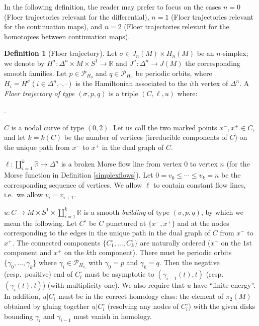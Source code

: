 \documentclass[12pt]{article}
\theoremstyle{definition}
\newtheorem{definition}[theorem]{Definition}
\theoremstyle{remark}
\numberwithin{equation}{subsection}
\newcommand{\RR}{\mathbb R}
\newcommand{\PPP}{\mathcal P}
\newcounter{rcounti}
\newenvironment{rlist}{\begin{list}{\roman{rcounti}.}{\usecounter{rcounti}
\setlength\itemsep{0pt}
\setlength\labelsep{4pt}
\setlength\labelwidth{16pt}
\setlength\leftmargin{32pt}
\setlength\listparindent{0pt}
\setlength\parsep{0pt}
\setlength\parskip{0pt}
\setlength\partopsep{0pt}
\setlength\rightmargin{0pt}
\setlength\topsep{0pt}
\setlength\itemindent{0pt}
}}{\end{list}}
\begin{document}
In the following definition, the reader may prefer to focus on the cases $n=0$ (Floer trajectories relevant for the differential), $n=1$ (Floer trajectories relevant for the continuation maps), and $n=2$ (Floer trajectories relevant for the homotopies between continuation maps).

\begin{definition}[Floer trajectory]\label{floertrajdef}
Let $\sigma\in J_n(M)\times H_n(M)$ be an $n$-simplex; we denote by $H^\sigma:\Delta^n\times M\times S^1\to\RR$ and $J^\sigma:\Delta^n\to J(M)$ the corresponding smooth families.  Let $p\in\PPP_{H_0}$ and $q\in\PPP_{H_n}$ be periodic orbits, where $H_i=H^\sigma(i\in\Delta^n,\cdot,\cdot)$ is the Hamiltonian associated to the $i$th vertex of $\Delta^n$.  A \emph{Floer trajectory of type $(\sigma,p,q)$} is a triple $(C,\ell,u)$ where:
\begin{rlist}
\item$C$ is a nodal curve of type $(0,2)$.  Let us call the two marked points $x^-,x^+\in C$, and let $k=k(C)$ be the number of vertices (irreducible components of $C$) on the unique path from $x^-$ to $x^+$ in the dual graph of $C$.
\item$\ell:\coprod_{i=1}^k\RR\to\Delta^n$ is a broken Morse flow line from vertex $0$ to vertex $n$ (for the Morse function in Definition \ref{simplexflows}).  Let $0=v_0\leq\cdots\leq v_k=n$ be the corresponding sequence of vertices.  We allow $\ell$ to contain constant flow lines, i.e.\ we allow $v_i=v_{i+1}$.
\item\label{buildingdef}$u:C\to M\times S^1\times\coprod_{i=1}^k\RR$ is a smooth \emph{building} of type $(\sigma,p,q)$, by which we mean the following.  Let $C^\circ$ be $C$ punctured at $\{x^-,x^+\}$ and at the nodes corresponding to the edges in the unique path in the dual graph of $C$ from $x^-$ to $x^+$.  The connected components $\{C^\circ_1,\ldots,C^\circ_k\}$ are naturally ordered ($x^-$ on the $1$st component and $x^+$ on the $k$th component).  There must be periodic orbits $\{\gamma_0,\ldots,\gamma_k\}$ where $\gamma_i\in\PPP_{H_{v_i}}$ with $\gamma_0=p$ and $\gamma_k=q$.  Then the negative (resp.\ positive) end of $C^\circ_i$ must be asymptotic to $(\gamma_{i-1}(t),t)$ (resp.\ $(\gamma_i(t),t)$) (with multiplicity one).  We also require that $u$ have ``finite energy''.  In addition, $u|C_i^\circ$ must be in the correct homology class: the element of $\pi_2(M)$ obtained by gluing together $u|C_i^\circ$ (resolving any nodes of $C_i^\circ$) with the given disks bounding $\gamma_i$ and $\gamma_{i-1}$ must vanish in homology.

\end{rlist}
\end{definition}
\end{document}
